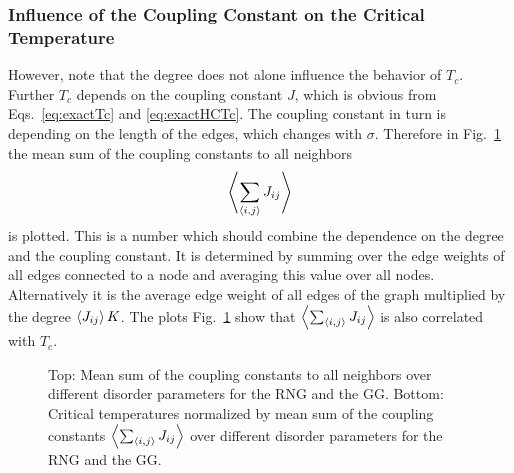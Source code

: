         \clearpage

    \subsubsection{Influence of the Coupling Constant on the Critical Temperature}
    \label{sssec:J}
        However, note that the degree does not alone influence the behavior of \(T_c\).
        Further \(T_c\) depends on the coupling constant \(J\), which is
        obvious from Eqs.\ \eqref{eq:exactTc} and \eqref{eq:exactHCTc}. The
        coupling constant in turn is depending on the length of the edges,
        which changes with \(\sigma\).
        Therefore  in Fig.\ \ref{fig:TcJ}
        the mean sum of the coupling constants to all neighbors
        \begin{equation}
            \left< \sum_{\left< i,j \right>} J_{ij} \right>
        \end{equation}
        is plotted. This is a number which should combine the dependence on
        the degree and the coupling constant. It is determined by summing
        over the edge weights of all edges connected to a node and averaging
        this value over all nodes. Alternatively it is the average edge weight
        of all edges of the graph multiplied by the degree \(\left< J_{ij} \right> K\).
        The plots Fig.\ \ref{fig:TcJ}
        show that \(\left< \sum_{\left< i,j \right>} J_{ij} \right>\) is also correlated with \(T_c\).
        \begin{figure}[htbp]
            \centering


            \caption[Critical Temperature Normalized by Mean Sum of the Coupling Constants]
            {
                Top: Mean sum of the coupling constants to all
                neighbors over different disorder parameters for
                 the RNG and
                 the GG.
                Bottom: Critical temperatures normalized by mean sum of the
                coupling constants \(\left< \sum_{\left< i,j \right>} J_{ij} \right>\) over different
                disorder parameters for
                 the RNG and
                 the GG.
            }
            \label{fig:TcJ}
        \end{figure}\\
